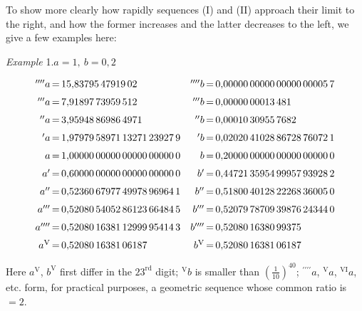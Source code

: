 \begingroup
\renewcommand{\arraystretch}{1.45}

To show more clearly how rapidly sequences (I) and (II) approach their limit
to the right, and how the former increases and the latter decreases to the left,
we give a few examples here:

\begin{center}\textit{Example} 1.\quad $a=1,\ b=0{,}2$\end{center}
\begingroup\small\setlength{\arraycolsep}{0pt}
\[\begin{array}{r@{\,=\,}l@{\quad}r@{\,=\,}l}
{}^{\prime\prime\prime\prime}a&15{,}83795\,47919\,02&{}^{\prime\prime\prime\prime}b&0{,}00000\,00000\,00000\,00005\,7\\[6pt]
{}^{\prime\prime\prime}a&7{,}91897\,73959\,512&{}^{\prime\prime\prime}b&0{,}00000\,00013\,481\\[6pt]
{}^{\prime\prime}a&3{,}95948\,86986\,4971&{}^{\prime\prime}b&0{,}00010\,30955\,7682\\[6pt]
{}^{\prime}a&1{,}97979\,58971\,13271\,23927\,9&{}^{\prime}b&0{,}02020\,41028\,86728\,76072\,1\\[6pt]
a&1{,}00000\,00000\,00000\,00000\,0&b&0{,}20000\,00000\,00000\,00000\,0\\[6pt]
a'&0{,}60000\,00000\,00000\,00000\,0&b'&0{,}44721\,35954\,99957\,93928\,2\\[6pt]
a''&0{,}52360\,67977\,49978\,96964\,1&b''&0{,}51800\,40128\,22268\,36005\,0\\[6pt]
a'''&0{,}52080\,54052\,86123\,66484\,5&b'''&0{,}52079\,78709\,39876\,24344\,0\\[6pt]
a''''&0{,}52080\,16381\,12999\,95414\,3&b''''&0{,}52080\,16380\,99375\\[6pt]
a^{\mathrm V}&0{,}52080\,16381\,06187&b^{\mathrm V}&0{,}52080\,16381\,06187
\end{array}
\]\endgroup

Here $a^{\mathrm V}$, $b^{\mathrm V}$ first differ in the $23^{\mathrm{rd}}$ digit;
${}^{\mathrm V}b$ is smaller than $(\frac{1}{10})^{40}$;
${}^{\prime\prime\prime\prime}a$, ${}^{\mathrm V}a$, ${}^{\mathrm{VI}}a$, etc.
form, for practical purposes, a geometric sequence whose common ratio is $=2$.

